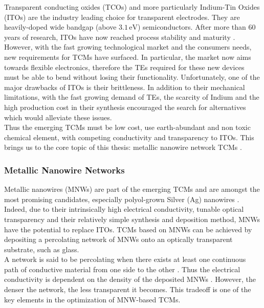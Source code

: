     Transparent conducting oxides (TCOs) and more particularly Indium-Tin Oxides (ITOs) are the industry leading choice for transparent electrodes. They are heavily-doped wide bandgap (above $3.1\,\text{eV}$) semiconductors. After more than 60 years of research, ITOs have now reached process stability and maturity \cite{MauryaGalvanGautamXu2022}. However, with the fast growing technological market and the consumers needs, new requirements for TCMs have surfaced. In particular, the market now aims towards flexible electronics, therefore the TEs required for these new devices must be able to bend without losing their functionality. Unfortunately, one of the major drawbacks of ITOs is their brittleness. In addition to their mechanical limitations, with the fast growing demand of TEs, the scarcity of Indium and the high production cost in their synthesis \cite{Bellet2017} encouraged the search for alternatives which would alleviate these issues.\\
    Thus the emerging TCMs must be low cost, use earth-abundant and non toxic chemical element, with competing conductivity and transparency to ITOs. This brings us to the core topic of this thesis: metallic nanowire network TCMs \cite{MauryaGalvanGautamXu2022}.%
    \subsubsection{Metallic Nanowire Networks}
    Metallic nanowires (MNWs) are part of the emerging TCMs and are amongst the most promising candidates, especially polyol-grown Silver (Ag) nanowires \cite{Sun2003}. Indeed, due to their intrinsically high electrical conductivity, tunable optical transparency and their relatively simple synthesis and deposition method, MNWs have the potential to replace ITOs. TCMs based on MNWs can be achieved by depositing a percolating network of MNWs onto an optically transparent substrate, such as glass.\\
    A network is said to be percolating when there exists at least one continuous path of conductive material from one side to the other \cite{SohnParkOhKangKim2019}. Thus the electrical conductivity is dependent on the density of the deposited MNWs \cite{BerginChenRathmellCharbonneauLiWiley2012, LagrangeLangleyGiustiJimenezBrechetBellet2015}. However, the denser the network, the less transparent it becomes. This tradeoff is one of the key elements in the optimization of MNW-based TCMs.
